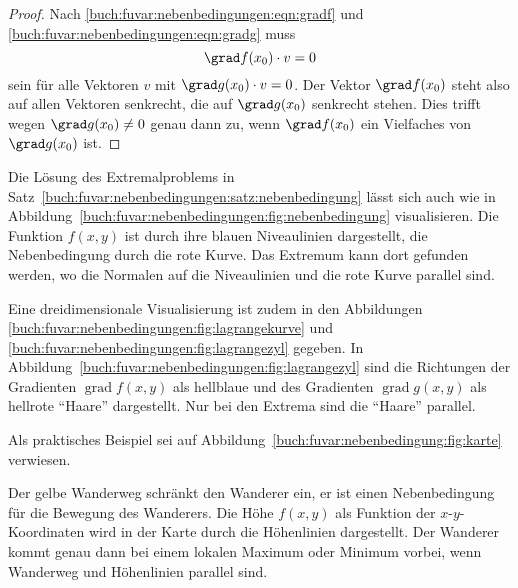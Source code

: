 \begin{proof}
Nach
\eqref{buch:fuvar:nebenbedingungen:eqn:gradf}
und
\eqref{buch:fuvar:nebenbedingungen:eqn:gradg}
muss 
\[
\grad f(x_0)\cdot v = 0
\]
sein für alle Vektoren $v$ mit $\grad g(x_0)\cdot v= 0$.
Der Vektor $\grad f(x_0)$ steht also auf allen Vektoren senkrecht, die
auf $\grad g(x_0)$ senkrecht stehen.
Dies trifft wegen $\grad g(x_0)\ne 0$ genau dann zu, wenn $\grad f(x_0)$
ein Vielfaches von $\grad g(x_0)$ ist.
\end{proof}

Die Lösung des Extremalproblems in
Satz~\ref{buch:fuvar:nebenbedingungen:satz:nebenbedingung}
lässt sich auch wie in
Abbildung~\ref{buch:fuvar:nebenbedingungen:fig:nebenbedingung}
visualisieren.
Die Funktion $f(x,y)$ ist durch ihre blauen Niveaulinien 
dargestellt, die Nebenbedingung durch die rote Kurve.
Das Extremum kann dort gefunden werden, wo die Normalen auf die
Niveaulinien und die rote Kurve parallel sind.


Eine dreidimensionale Visualisierung ist zudem in den 
Abbildungen
\ref{buch:fuvar:nebenbedingungen:fig:lagrangekurve}
und
\ref{buch:fuvar:nebenbedingungen:fig:lagrangezyl}
gegeben.
In
Abbildung~\ref{buch:fuvar:nebenbedingungen:fig:lagrangezyl}
sind die Richtungen der Gradienten $\operatorname{grad} f(x,y)$ als
hellblaue und des Gradienten $\operatorname{grad}g(x,y)$ als hellrote
``Haare'' dargestellt.
Nur bei den Extrema sind die ``Haare'' parallel.

Als praktisches Beispiel sei auf
Abbildung~\ref{buch:fuvar:nebenbedingung:fig:karte}
verwiesen.

Der {\color{gelb}gelbe} Wanderweg schränkt den Wanderer ein,
er ist einen Nebenbedingung für die Bewegung des Wanderers.
Die Höhe $f(x,y)$ als Funktion der $x$-$y$-Koordinaten wird in
der Karte durch die Höhenlinien dargestellt.
Der Wanderer kommt genau dann bei einem lokalen Maximum oder
Minimum vorbei, wenn Wanderweg und Höhenlinien parallel sind.

